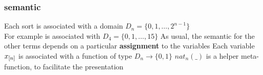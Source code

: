 \begin{frame}
  \frametitle{\bitvector semantic}

  \scriptsize

  Each sort  is associated with a domain $D_n = \{ 0, 1, \ldots, 2^{n-1} \}$ \\ \pause
  For example  is associated with $D_{4} = \{ 0, 1, \ldots, 15 \}$
  \vfill
  \pause
  As usual, the semantic for the other terms depends on a particular {\bf assignment}
  to the variables
  \vfill
  \pause
  Each variable $x_{[n]}$ is associated with a function  
  of type $D_n \rightarrow \{ 0, 1 \}$
  \vfill
  \pause
  \scalebox{.7}{}
  \vfill
  \pause
  $nat_n(\_)$ is a helper meta-function, to facilitate the presentation 

\end{frame}

